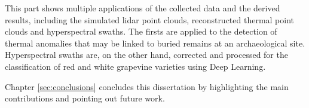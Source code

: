 \small \noindent \textbf{} \normalsize\hspace{\partTabSize} This part shows multiple applications of the collected data and the derived results, including the simulated \acrshort{lidar} point clouds, reconstructed thermal point clouds and hyperspectral swaths. The firsts are applied to the detection of thermal anomalies that may be linked to buried remains at an archaeological site. Hyperspectral swaths are, on the other hand, corrected and processed for the classification of red and white grapevine varieties using Deep Learning.

\small \noindent \textbf{} \normalsize\hspace{\partTabSize} Chapter \ref{sec:conclusions} concludes this dissertation by highlighting the main contributions and pointing out future work.